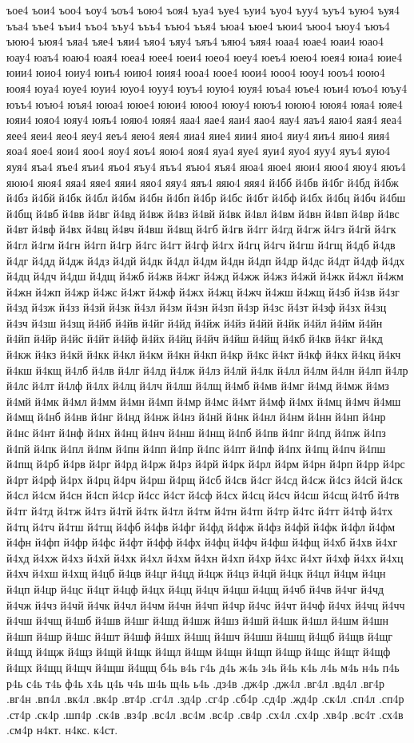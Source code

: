 {ъое4
ъои4
ъоо4
ъоу4
ъоъ4
ъою4
ъоя4
ъуа4
ъуе4
ъуи4
ъуо4
ъуу4
ъуъ4
ъую4
ъуя4
ъъа4
ъъе4
ъъи4
ъъо4
ъъу4
ъъъ4
ъъю4
ъъя4
ъюа4
ъюе4
ъюи4
ъюо4
ъюу4
ъюъ4
ъюю4
ъюя4
ъяа4
ъяе4
ъяи4
ъяо4
ъяу4
ъяъ4
ъяю4
ъяя4
юаа4
юае4
юаи4
юао4
юау4
юаъ4
юаю4
юая4
юеа4
юее4
юеи4
юео4
юеу4
юеъ4
юею4
юея4
юиа4
юие4
юии4
юио4
юиу4
юиъ4
юию4
юия4
юоа4
юое4
юои4
юоо4
юоу4
юоъ4
юою4
юоя4
юуа4
юуе4
юуи4
юуо4
юуу4
юуъ4
юую4
юуя4
юъа4
юъе4
юъи4
юъо4
юъу4
юъъ4
юъю4
юъя4
ююа4
ююе4
ююи4
ююо4
ююу4
ююъ4
ююю4
ююя4
юяа4
юяе4
юяи4
юяо4
юяу4
юяъ4
юяю4
юяя4
яаа4
яае4
яаи4
яао4
яау4
яаъ4
яаю4
яая4
яеа4
яее4
яеи4
яео4
яеу4
яеъ4
яею4
яея4
яиа4
яие4
яии4
яио4
яиу4
яиъ4
яию4
яия4
яоа4
яое4
яои4
яоо4
яоу4
яоъ4
яою4
яоя4
яуа4
яуе4
яуи4
яуо4
яуу4
яуъ4
яую4
яуя4
яъа4
яъе4
яъи4
яъо4
яъу4
яъъ4
яъю4
яъя4
яюа4
яюе4
яюи4
яюо4
яюу4
яюъ4
яюю4
яюя4
яяа4
яяе4
яяи4
яяо4
яяу4
яяъ4
яяю4
яяя4
й4бб
й4бв
й4бг
й4бд
й4бж
й4бз
й4бй
й4бк
й4бл
й4бм
й4бн
й4бп
й4бр
й4бс
й4бт
й4бф
й4бх
й4бц
й4бч
й4бш
й4бщ
й4вб
й4вв
й4вг
й4вд
й4вж
й4вз
й4вй
й4вк
й4вл
й4вм
й4вн
й4вп
й4вр
й4вс
й4вт
й4вф
й4вх
й4вц
й4вч
й4вш
й4вщ
й4гб
й4гв
й4гг
й4гд
й4гж
й4гз
й4гй
й4гк
й4гл
й4гм
й4гн
й4гп
й4гр
й4гс
й4гт
й4гф
й4гх
й4гц
й4гч
й4гш
й4гщ
й4дб
й4дв
й4дг
й4дд
й4дж
й4дз
й4дй
й4дк
й4дл
й4дм
й4дн
й4дп
й4др
й4дс
й4дт
й4дф
й4дх
й4дц
й4дч
й4дш
й4дщ
й4жб
й4жв
й4жг
й4жд
й4жж
й4жз
й4жй
й4жк
й4жл
й4жм
й4жн
й4жп
й4жр
й4жс
й4жт
й4жф
й4жх
й4жц
й4жч
й4жш
й4жщ
й4зб
й4зв
й4зг
й4зд
й4зж
й4зз
й4зй
й4зк
й4зл
й4зм
й4зн
й4зп
й4зр
й4зс
й4зт
й4зф
й4зх
й4зц
й4зч
й4зш
й4зщ
й4йб
й4йв
й4йг
й4йд
й4йж
й4йз
й4йй
й4йк
й4йл
й4йм
й4йн
й4йп
й4йр
й4йс
й4йт
й4йф
й4йх
й4йц
й4йч
й4йш
й4йщ
й4кб
й4кв
й4кг
й4кд
й4кж
й4кз
й4кй
й4кк
й4кл
й4км
й4кн
й4кп
й4кр
й4кс
й4кт
й4кф
й4кх
й4кц
й4кч
й4кш
й4кщ
й4лб
й4лв
й4лг
й4лд
й4лж
й4лз
й4лй
й4лк
й4лл
й4лм
й4лн
й4лп
й4лр
й4лс
й4лт
й4лф
й4лх
й4лц
й4лч
й4лш
й4лщ
й4мб
й4мв
й4мг
й4мд
й4мж
й4мз
й4мй
й4мк
й4мл
й4мм
й4мн
й4мп
й4мр
й4мс
й4мт
й4мф
й4мх
й4мц
й4мч
й4мш
й4мщ
й4нб
й4нв
й4нг
й4нд
й4нж
й4нз
й4нй
й4нк
й4нл
й4нм
й4нн
й4нп
й4нр
й4нс
й4нт
й4нф
й4нх
й4нц
й4нч
й4нш
й4нщ
й4пб
й4пв
й4пг
й4пд
й4пж
й4пз
й4пй
й4пк
й4пл
й4пм
й4пн
й4пп
й4пр
й4пс
й4пт
й4пф
й4пх
й4пц
й4пч
й4пш
й4пщ
й4рб
й4рв
й4рг
й4рд
й4рж
й4рз
й4рй
й4рк
й4рл
й4рм
й4рн
й4рп
й4рр
й4рс
й4рт
й4рф
й4рх
й4рц
й4рч
й4рш
й4рщ
й4сб
й4св
й4сг
й4сд
й4сж
й4сз
й4сй
й4ск
й4сл
й4см
й4сн
й4сп
й4ср
й4сс
й4ст
й4сф
й4сх
й4сц
й4сч
й4сш
й4сщ
й4тб
й4тв
й4тг
й4тд
й4тж
й4тз
й4тй
й4тк
й4тл
й4тм
й4тн
й4тп
й4тр
й4тс
й4тт
й4тф
й4тх
й4тц
й4тч
й4тш
й4тщ
й4фб
й4фв
й4фг
й4фд
й4фж
й4фз
й4фй
й4фк
й4фл
й4фм
й4фн
й4фп
й4фр
й4фс
й4фт
й4фф
й4фх
й4фц
й4фч
й4фш
й4фщ
й4хб
й4хв
й4хг
й4хд
й4хж
й4хз
й4хй
й4хк
й4хл
й4хм
й4хн
й4хп
й4хр
й4хс
й4хт
й4хф
й4хх
й4хц
й4хч
й4хш
й4хщ
й4цб
й4цв
й4цг
й4цд
й4цж
й4цз
й4цй
й4цк
й4цл
й4цм
й4цн
й4цп
й4цр
й4цс
й4цт
й4цф
й4цх
й4цц
й4цч
й4цш
й4цщ
й4чб
й4чв
й4чг
й4чд
й4чж
й4чз
й4чй
й4чк
й4чл
й4чм
й4чн
й4чп
й4чр
й4чс
й4чт
й4чф
й4чх
й4чц
й4чч
й4чш
й4чщ
й4шб
й4шв
й4шг
й4шд
й4шж
й4шз
й4шй
й4шк
й4шл
й4шм
й4шн
й4шп
й4шр
й4шс
й4шт
й4шф
й4шх
й4шц
й4шч
й4шш
й4шщ
й4щб
й4щв
й4щг
й4щд
й4щж
й4щз
й4щй
й4щк
й4щл
й4щм
й4щн
й4щп
й4щр
й4щс
й4щт
й4щф
й4щх
й4щц
й4щч
й4щш
й4щщ
б4ь
в4ь
г4ь
д4ь
ж4ь
з4ь
й4ь
к4ь
л4ь
м4ь
н4ь
п4ь
р4ь
с4ь
т4ь
ф4ь
х4ь
ц4ь
ч4ь
ш4ь
щ4ь
ь4ь
.дз4в
.дж4р
.дж4л
.вг4л
.вд4л
.вг4р
.вг4н
.вп4л
.вк4л
.вк4р
.вт4р
.сг4л
.зд4р
.сг4р
.сб4р
.сд4р
.жд4р
.ск4л
.сп4л
.сп4р
.ст4р
.ск4р
.шп4р
.ск4в
.вз4р
.вс4л
.вс4м
.вс4р
.св4р
.сх4л
.сх4р
.хв4р
.вс4т
.сх4в
.см4р
н4кт.
н4кс.
к4ст.
}

